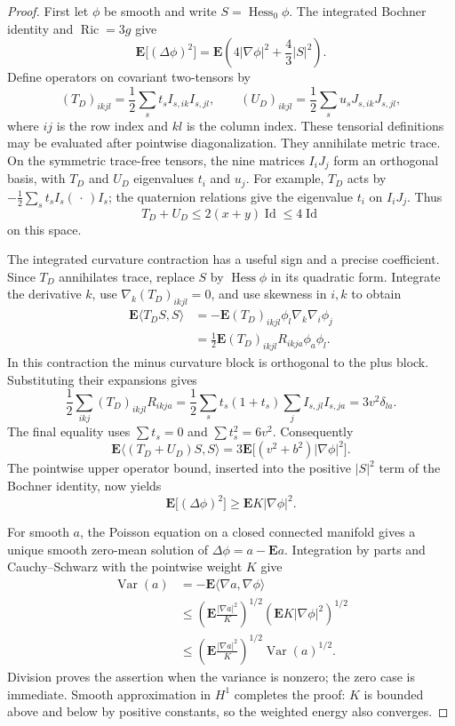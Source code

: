\begin{proof}
First let $\phi$ be smooth and write
$S=\operatorname{Hess}_0\phi$. The integrated Bochner identity
and $\operatorname{Ric}=3g$ give
\[
 \mathbf E\bigl[(\Delta\phi)^2\bigr]
 =\mathbf E\left(4|\nabla\phi|^2+\frac43|S|^2\right).
\]
Define operators on covariant two-tensors by
\[
 (T_D)_{ikjl}=\frac12\sum_s t_s I_{s,ik}I_{s,jl},
 \qquad
 (U_D)_{ikjl}=\frac12\sum_s u_s J_{s,ik}J_{s,jl},
\]
where $ij$ is the row index and $kl$ is the column index.
These tensorial definitions may be evaluated after pointwise
diagonalization. They annihilate metric trace. On the symmetric
trace-free tensors, the nine matrices $I_iJ_j$ form an orthogonal
basis, with $T_D$ and $U_D$ eigenvalues $t_i$ and $u_j$.
For example, $T_D$ acts by
$-\frac12\sum_s t_s I_s(\,\cdot\,)I_s$; the quaternion relations
give the eigenvalue $t_i$ on $I_iJ_j$.
Thus
\[
 T_D+U_D\le 2(x+y)\operatorname{Id}\le4\operatorname{Id}
\]
on this space.

The integrated curvature contraction has a useful sign and a precise
coefficient. Since $T_D$ annihilates trace, replace $S$ by
$\operatorname{Hess}\phi$ in its quadratic form. Integrate the
derivative $k$, use $\nabla_k(T_D)_{ikjl}=0$, and use skewness in
$i,k$ to obtain
\[
 \begin{aligned}
 \mathbf E\langle T_DS,S\rangle
 &=-\mathbf E (T_D)_{ikjl}\phi_l\nabla_k\nabla_i\phi_j\\
 &=\frac12\mathbf E (T_D)_{ikjl}R_{ikja}\phi_a\phi_l.
 \end{aligned}
\]
In this contraction the minus curvature block is orthogonal to the
plus block. Substituting their expansions gives
\[
 \frac12\sum_{ikj}(T_D)_{ikjl}R_{ikja}
 =\frac12\sum_s t_s(1+t_s)
                 \sum_j I_{s,jl}I_{s,ja}
 =3v^2\delta_{la}.
\]
The final equality uses $\sum t_s=0$ and $\sum t_s^2=6v^2$.
Consequently
\[
 \mathbf E\langle(T_D+U_D)S,S\rangle
 =3\mathbf E\bigl[(v^2+b^2)|\nabla\phi|^2\bigr].
\]
The pointwise upper operator bound, inserted into the positive
$|S|^2$ term of the Bochner identity, now yields
\[
 \mathbf E\bigl[(\Delta\phi)^2\bigr]\ge\mathbf E K|\nabla\phi|^2.
\]

For smooth $a$, the Poisson equation on a closed connected manifold
gives a unique smooth zero-mean solution of
$\Delta\phi=a-\mathbf E a$. Integration
by parts and Cauchy--Schwarz with the pointwise weight $K$ give
\[
 \begin{aligned}
 \operatorname{Var}(a)
 &=-\mathbf E\langle\nabla a,\nabla\phi\rangle\\
 &\le
 \left(\mathbf E\frac{|\nabla a|^2}{K}\right)^{1/2}
 \left(\mathbf E K|\nabla\phi|^2\right)^{1/2}\\
 &\le
 \left(\mathbf E\frac{|\nabla a|^2}{K}\right)^{1/2}
 \operatorname{Var}(a)^{1/2}.
 \end{aligned}
\]
Division proves the assertion when the variance is nonzero; the
zero case is immediate. Smooth approximation in $H^1$ completes the
proof: $K$ is bounded above and below by positive constants, so the
weighted energy also converges.
\end{proof}


